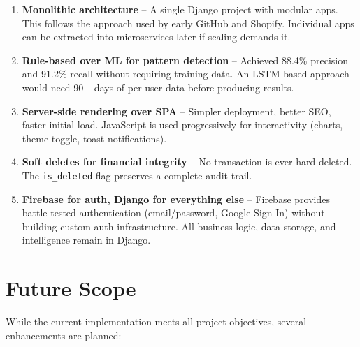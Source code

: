\documentclass[12pt,a4paper]{article}
\begin{document}
\begin{enumerate}
  \item \textbf{Monolithic architecture} -- A single Django project with modular apps. This follows the approach used by early GitHub and Shopify. Individual apps can be extracted into microservices later if scaling demands it.
  
  \item \textbf{Rule-based over ML for pattern detection} -- Achieved 88.4\% precision and 91.2\% recall without requiring training data. An LSTM-based approach would need 90+ days of per-user data before producing results.
  
  \item \textbf{Server-side rendering over SPA} -- Simpler deployment, better SEO, faster initial load. JavaScript is used progressively for interactivity (charts, theme toggle, toast notifications).
  
  \item \textbf{Soft deletes for financial integrity} -- No transaction is ever hard-deleted. The \texttt{is\_deleted} flag preserves a complete audit trail.
  
  \item \textbf{Firebase for auth, Django for everything else} -- Firebase provides battle-tested authentication (email/password, Google Sign-In) without building custom auth infrastructure. All business logic, data storage, and intelligence remain in Django.
\end{enumerate}

\section{Future Scope}

While the current implementation meets all project objectives, several enhancements are planned:
\end{document}
